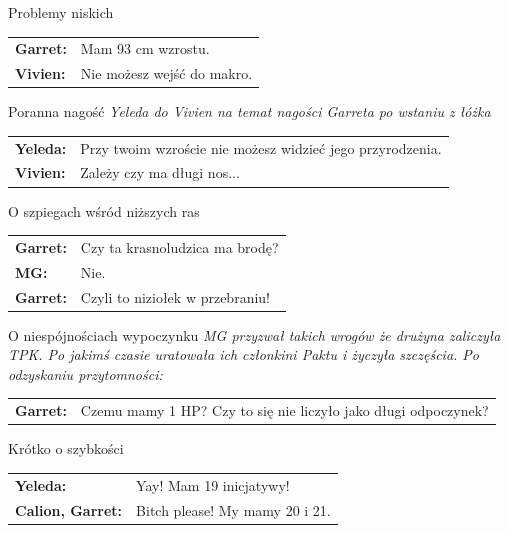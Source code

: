 \documentclass[10pt,twoside,twocolumn]{book}
\begin{document}
\begin{rpg-quotebox}{Problemy niskich}
   \begin{tabularx}{\columnwidth}{lX}
      \textbf{Garret:} & Mam 93 cm wzrostu. \\
      \textbf{Vivien:} & Nie możesz wejść do makro.
   \end{tabularx}
\end{rpg-quotebox}


\begin{rpg-quotebox}{Poranna nagość}
   \textit{Yeleda do Vivien na temat nagości Garreta po wstaniu z łóżka}\\

   \begin{tabularx}{\columnwidth}{lX}
      \textbf{Yeleda:} & Przy twoim wzroście nie możesz widzieć jego przyrodzenia. \\
      \textbf{Vivien:} & Zależy czy ma długi nos...
   \end{tabularx}
\end{rpg-quotebox}


\begin{rpg-quotebox}{O szpiegach wśród niższych ras}
   \begin{tabularx}{\columnwidth}{lX}
      \textbf{Garret:} & Czy ta krasnoludzica ma brodę? \\
      \textbf{MG:}     & Nie. \\
      \textbf{Garret:} & Czyli to niziołek w przebraniu!
   \end{tabularx}
\end{rpg-quotebox}


\begin{rpg-quotebox}{O niespójnościach wypoczynku}
   \textit{MG przyzwał takich wrogów że drużyna zaliczyła TPK. Po jakimś czasie uratowała ich członkini Paktu i życzyła szczęścia. Po odzyskaniu przytomności:} \\

   \begin{tabularx}{\columnwidth}{lX}
      \textbf{Garret:} & Czemu mamy 1 HP? Czy to się nie liczyło jako długi odpoczynek?
   \end{tabularx}
\end{rpg-quotebox}


\begin{rpg-quotebox}{Krótko o szybkości}
   \begin{tabularx}{\columnwidth}{lX}
      \textbf{Yeleda:} & Yay! Mam 19 inicjatywy! \\
      \textbf{Calion, Garret:} & Bitch please! My mamy 20 i 21.
   \end{tabularx}
\end{rpg-quotebox}
\end{document}
